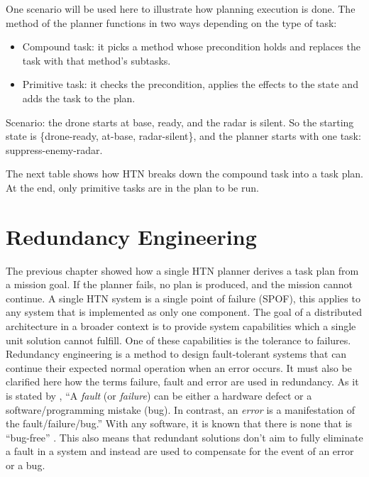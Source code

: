 

One scenario will be used here to illustrate how planning execution is done. The method of the planner functions in two ways depending on the type of task:
\begin{itemize}
  \item Compound task: it picks a method whose precondition holds and replaces the task with that method’s subtasks.
  \item Primitive task: it checks the precondition, applies the effects to the state and adds the task to the plan.
\end{itemize}

Scenario: the drone starts at base, ready, and the radar is silent. So the starting state is \{drone-ready, at-base, radar-silent\}, and the planner starts with one task: suppress-enemy-radar.



The next table shows how HTN breaks down the compound task into a task plan. At the end, only primitive tasks are in the plan to be run. %






\section{Redundancy Engineering}
\label{sec:redundancy}

The previous chapter showed how a single HTN planner derives a task plan from a mission goal. If the planner fails, no plan is produced, and the mission cannot continue. A single HTN system is a single point of failure (SPOF), this applies to any system that is implemented as only one component. The goal of a distributed architecture in a broader context is to provide system capabilities which a single unit solution cannot fulfill. One of these capabilities is the tolerance to failures. %
Redundancy engineering is a method to design fault-tolerant systems that can continue their expected normal operation when an error occurs. It must also be clarified here how the terms failure, fault and error are used in redundancy. As it is stated by \textcite[1]{koren_fault-tolerant_2021}, ``A \emph{fault} (or \emph{failure}) can be either a hardware defect or a software/programming mistake (bug). In contrast, an \emph{error} is a manifestation of the fault/failure/bug.'' With any software, it is known that there is none that is ``bug-free'' \parencite{smith_seismology_2018}. This also means that redundant solutions don't aim to fully eliminate a fault in a system and instead are used to compensate for the event of an error or a bug.

